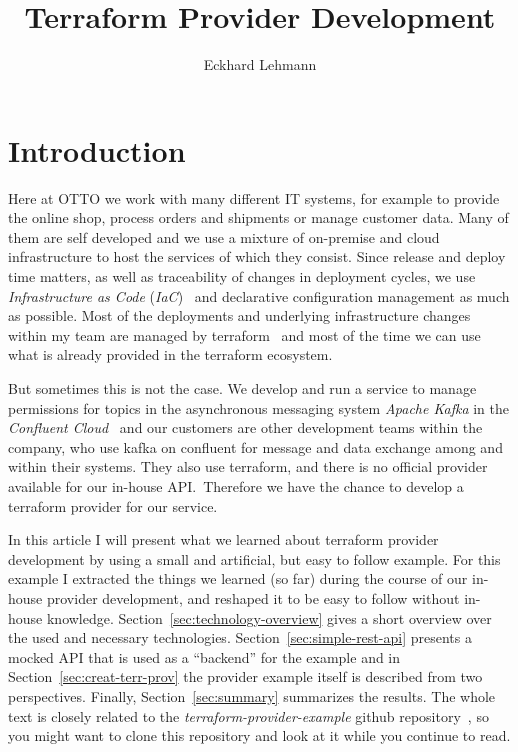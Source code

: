 \documentclass[paper=a4,11pt,numbers=noenddot]{article}
\title{Terraform Provider Development}
\author{Eckhard Lehmann}
\begin{document}
\maketitle
\tableofcontents

\section{Introduction}

Here at OTTO we work with many different IT systems, for example to provide the online shop, process orders and shipments or manage customer data. Many of them are self developed and we use a mixture of on-premise and cloud infrastructure to host the services of which they consist. Since release and deploy time matters, as well as traceability of changes in deployment cycles, we use \emph{Infrastructure as Code} (\emph{IaC})~\autocite{morris_infrastructure_as_code_2025} and declarative configuration management as much as possible. Most of the deployments and underlying infrastructure changes within my team are managed by terraform~\autocite{noauthor_terraform_nodate} and most of the time we can use what is already provided in the terraform ecosystem.

But sometimes this is not the case. We develop and run a service to manage permissions for topics in the asynchronous messaging system \emph{Apache Kafka} in the \emph{Confluent Cloud}~\autocite{noauthor_apache_kafka_nodate, noauthor_confluent_nodate} and our customers are other development teams within the company, who use kafka on confluent for message and data exchange among and within their systems. They also use terraform, and there is no official provider available for our in-house API.\ Therefore we have the chance to develop a terraform provider for our service.

In this article I will present what we learned about terraform provider development by using a small and artificial, but easy to follow example. For this example I extracted the things we learned (so far) during the course of our in-house provider development, and reshaped it to be easy to follow without in-house knowledge. Section~\ref{sec:technology-overview} gives a short overview over the used and necessary technologies. Section~\ref{sec:simple-rest-api} presents a mocked API that is used as a ``backend'' for the example and in Section~\ref{sec:creat-terr-prov} the provider example itself is described from two perspectives. Finally, Section~\ref{sec:summary} summarizes the results. The whole text is closely related to the \emph{terraform-provider-example} github repository~\autocite{ecky-l_terraform-provider-example_nodate}, so you might want to clone this repository and look at it while you continue to read.
\end{document}
